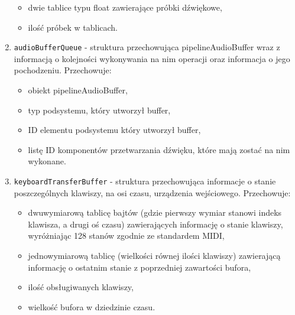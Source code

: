 \begin{enumerate}
\begin{itemize}
        \item dwie tablice typu float zawierające próbki dźwiękowe,
        \item ilość próbek w tablicach.
    \end{itemize}
    \item \texttt{audioBufferQueue} - struktura przechowująca pipelineAudioBuffer wraz z informacją o kolejności wykonywania na nim operacji oraz informacja o jego pochodzeniu. Przechowuje:
    \begin{itemize}
        \item obiekt pipelineAudioBuffer,
        \item typ podsystemu, który utworzył buffer,
        \item ID elementu podsystemu który utworzył buffer,
        \item listę ID komponentów przetwarzania dźwięku, które mają zostać na nim wykonane.
    \end{itemize}
    \item \texttt{keyboardTransferBuffer} - struktura przechowująca informacje o stanie poszczególnych klawiszy, na osi czasu, urządzenia wejściowego. Przechowuje:
    \begin{itemize}
        \item dwuwymiarową tablicę bajtów (gdzie pierwszy wymiar stanowi indeks klawisza, a drugi oś czasu) zawierających informację o stanie klawiszy, wyróżniając 128 stanów zgodnie ze standardem MIDI,
        \item jednowymiarową tablicę (wielkości równej ilości klawiszy) zawierającą informację o ostatnim stanie z poprzedniej zawartości bufora,
        \item ilość obsługiwanych klawiszy,
        \item wielkość bufora w dziedzinie czasu.
    \end{itemize}
\end{enumerate}
